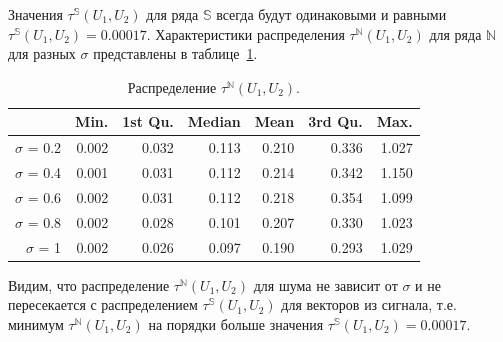 \documentclass[specialist,
               substylefile = spbu.rtx,
               subf,href,colorlinks=true, 12pt]{disser}
\begin{document}
Значения $\tau^{\mathbb{S}}(U_1, U_2)$  для ряда $\mathbb{S}$ всегда будут одинаковыми и равными  $\tau^{\mathbb{S}}(U_1, U_2) = 0.00017$. Характеристики распределения $\tau^{\mathbb{N}}(U_1, U_2)$ для ряда $\mathbb{N}$ для разных $\sigma$ представлены в таблице~\ref{tab:model_dist_tau1_sig_notint}.

\begin{table}[hhh!]
\caption{Распределение $\tau^{\mathbb{N}}(U_1, U_2)$.}
\centering
\begin{tabular}{rrrrrrr}
  \hline
 & Min. & 1st Qu. & Median & Mean & 3rd Qu. & Max. \\ 
  \hline
$\sigma$ = 0.2 & 0.002 & 0.032 & 0.113 & 0.210 & 0.336 & 1.027 \\ 
  $\sigma$ = 0.4 & 0.001 & 0.031 & 0.112 & 0.214 & 0.342 & 1.150 \\ 
  $\sigma$ = 0.6 & 0.002 & 0.031 & 0.112 & 0.218 & 0.354 & 1.099 \\ 
  $\sigma$ = 0.8 & 0.002 & 0.028 & 0.101 & 0.207 & 0.330 & 1.023 \\ 
  $\sigma$ = 1 & 0.002 & 0.026 & 0.097 & 0.190 & 0.293 & 1.029 \\ 
   \hline
\end{tabular}
\label{tab:model_dist_tau1_sig_notint}
\end{table}


Видим, что распределение $\tau^{\mathbb{N}}(U_1, U_2)$ для шума не зависит от $\sigma$ и не пересекается с распределением $\tau^{\mathbb{S}}(U_1, U_2)$ для векторов из сигнала, т.е. минимум $\tau^{\mathbb{N}}(U_1, U_2)$ на порядки больше значения $\tau^{\mathbb{S}}(U_1, U_2) = 0.00017$. 
%
%
\end{document}
